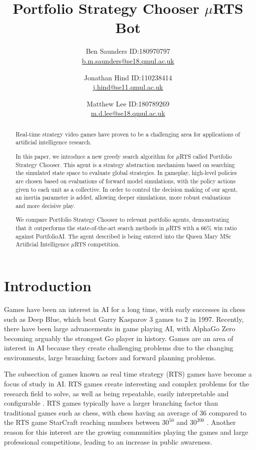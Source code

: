\documentclass[]{article}
\title{Portfolio Strategy Chooser $\mu$RTS Bot}
\author{Ben Saunders ID:180970797\\  \href{mailto:b.m.saunders@se18.qmul.ac.uk}{b.m.saunders@se18.qmul.ac.uk} \and
Jonathan Hind ID:110238414\\  \href{mailto:j.hind@se11.qmul.ac.uk}{j.hind@se11.qmul.ac.uk}\and
Matthew Lee ID:180789269\\  \href{mailto:m.d.lee@se18.qmul.ac.uk}{m.d.lee@se18.qmul.ac.uk}}
\begin{document}
\maketitle

\begin{abstract}
Real-time strategy video games have proven to be a challenging area for applications of artificial intelligence research.

In this paper, we introduce a new greedy search algorithm for $\mu$RTS called Portfolio Strategy Chooser. This agent is a strategy abstraction mechanism based on searching the simulated state space to evaluate global strategies. In gameplay, high-level policies are chosen based on evaluations of forward model simulations, with the policy actions given to each unit as a collective. In order to control the decision making of our agent, an inertia parameter is added, allowing deeper simulations, more robust evaluations and more decisive play.

We compare Portfolio Strategy Chooser to relevant portfolio agents, demonstrating that it outperforms the state-of-the-art search methods in $\mu$RTS with a 66\% win ratio against PortfolioAI. The agent described is being entered into the Queen Mary MSc Artificial Intelligence $\mu$RTS competition.

\end{abstract}

\section{Introduction}
Games have been an interest in AI for a long time, with early successes in chess such as Deep Blue, \cite{campbell2002deep} which beat Garry Kasparov 3 games to 2 in 1997. Recently, there have been large advancements in game playing AI, with AlphaGo Zero \cite{silver2017mastering} becoming arguably the strongest Go player in history. Games are an area of interest in AI because they create challenging problems due to the changing environments, large branching factors and forward planning problems. 


The subsection of games known as real time strategy (RTS) games have become a focus of study in AI. RTS games create interesting and complex problems for the research field to solve, as well as being repeatable, easily interpretable and configurable \cite{weber2011building}. RTS games typically have a larger branching factor than traditional games such as chess, with chess having an average of 36 compared to the RTS game StarCraft reaching numbers between $30^{50}$ and $30^{200}$ \cite{ontanon2013survey}. Another reason for this interest are the growing communities playing the games and large professional competitions, leading to an increase in public awareness. 
\end{document}
